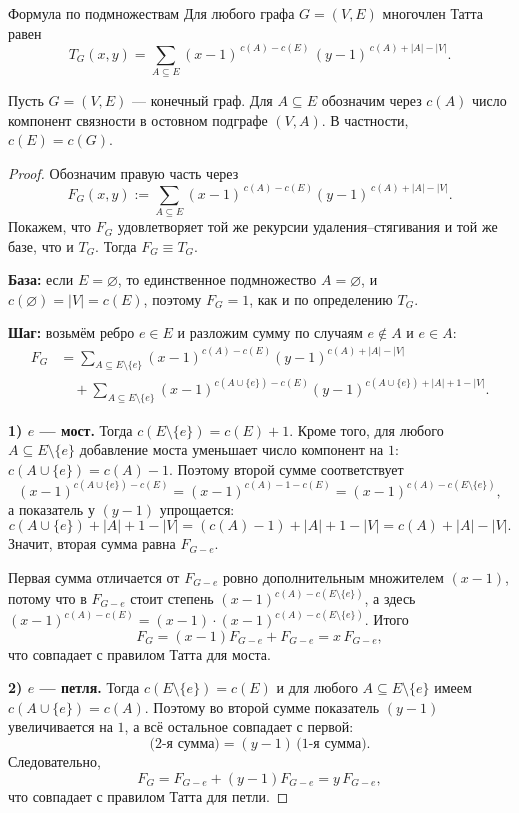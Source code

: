 \begin{Theorem}{Формула по подмножествам}{}
	Для любого графа $G=(V,E)$ многочлен Татта равен
	\[
	T_G(x,y)=\sum_{A\subseteq E}
	(x-1)^{\,c(A)-c(E)}\,(y-1)^{\,c(A)+|A|-|V|}.
	\]
\end{Theorem}

\begin{Remark}{}{}
	Пусть $G=(V,E)$ — конечный граф. Для $A\subseteq E$ обозначим через
	$c(A)$ число компонент связности в остовном подграфе $(V,A)$.
	В частности, $c(E)=c(G)$.
\end{Remark}

\begin{proof}
	Обозначим правую часть через
	\[
	F_G(x,y):=\sum_{A\subseteq E}
	(x-1)^{\,c(A)-c(E)}(y-1)^{\,c(A)+|A|-|V|}.
	\]
	Покажем, что $F_G$ удовлетворяет той же рекурсии удаления--стягивания и той же базе,
	что и $T_G$. Тогда $F_G\equiv T_G$.
	
	\smallskip
	\noindent\textbf{База:} если $E=\varnothing$, то единственное подмножество $A=\varnothing$,
	и $c(\varnothing)=|V|=c(E)$, поэтому $F_G=1$, как и по определению $T_G$.
	
	\smallskip
	\noindent\textbf{Шаг:} возьмём ребро $e\in E$ и разложим сумму по случаям $e\notin A$ и $e\in A$:
	\begin{align*}
		F_G
		&=\sum_{A\subseteq E\setminus\{e\}}
		(x-1)^{c(A)-c(E)}(y-1)^{c(A)+|A|-|V|} \\
		&\quad+\sum_{A\subseteq E\setminus\{e\}}
		(x-1)^{c(A\cup\{e\})-c(E)}(y-1)^{c(A\cup\{e\})+|A|+1-|V|}.
	\end{align*}
	
	\medskip
	\noindent\textbf{1) $e$ — мост.}
	Тогда $c(E\setminus\{e\})=c(E)+1$.
	Кроме того, для любого $A\subseteq E\setminus\{e\}$ добавление моста уменьшает число компонент на $1$:
	$c(A\cup\{e\})=c(A)-1$.
	Поэтому второй сумме соответствует
	\[
	(x-1)^{c(A\cup\{e\})-c(E)}=(x-1)^{c(A)-1-c(E)}=(x-1)^{c(A)-c(E\setminus\{e\})},
	\]
	а показатель у $(y-1)$ упрощается:
	\[
	c(A\cup\{e\})+|A|+1-|V|=(c(A)-1)+|A|+1-|V|=c(A)+|A|-|V|.
	\]
	Значит, вторая сумма равна $F_{G-e}$.
	
	Первая сумма отличается от $F_{G-e}$ ровно дополнительным множителем $(x-1)$,
	потому что в $F_{G-e}$ стоит степень $(x-1)^{c(A)-c(E\setminus\{e\})}$, а здесь
	$(x-1)^{c(A)-c(E)}=(x-1)\cdot (x-1)^{c(A)-c(E\setminus\{e\})}$.
	Итого
	\[
	F_G=(x-1)F_{G-e}+F_{G-e}=x\,F_{G-e},
	\]
	что совпадает с правилом Татта для моста.
	
	\medskip
	\noindent\textbf{2) $e$ — петля.}
	Тогда $c(E\setminus\{e\})=c(E)$ и для любого $A\subseteq E\setminus\{e\}$ имеем
	$c(A\cup\{e\})=c(A)$.
	Поэтому во второй сумме показатель $(y-1)$ увеличивается на $1$, а всё остальное совпадает с первой:
	\[
	\text{(2-я сумма)}=(y-1)\,\text{(1-я сумма)}.
	\]
	Следовательно,
	\[
	F_G=F_{G-e}+(y-1)F_{G-e}=y\,F_{G-e},
	\]
	что совпадает с правилом Татта для петли.
	

\end{proof}
